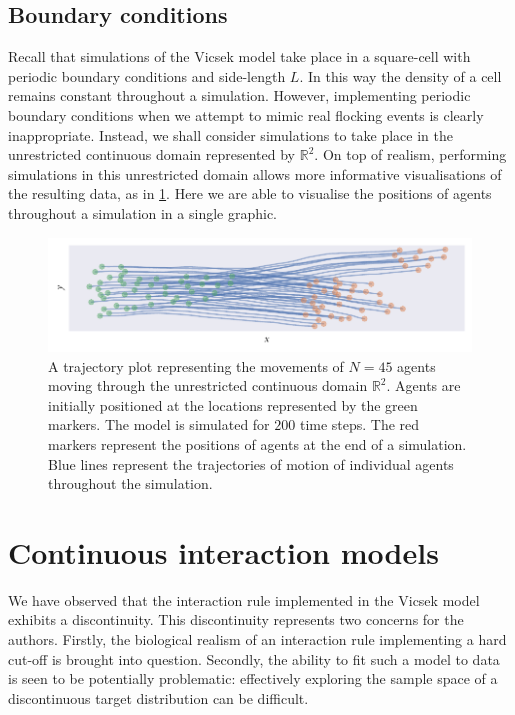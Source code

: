 \subsection{Boundary conditions}

Recall that simulations of the Vicsek model take place in a square-cell with periodic
boundary conditions and side-length $L$. In this way the density of a cell remains
constant throughout a simulation. However, implementing periodic boundary conditions when
we attempt to mimic real flocking events is clearly inappropriate. Instead, we shall
consider simulations to take place in the unrestricted continuous domain represented by
$\mathbb{R}^2$.  On top of realism, performing simulations in this unrestricted domain
allows more informative visualisations of the resulting data, as in
\cref{fig:example_traj}. Here we are able to visualise the positions of agents throughout
a simulation in a single graphic.

\begin{figure}[tb]
    \includegraphics{example_traj_plot.pdf}
    \caption{A trajectory plot representing the movements of $N=45$ agents moving through
        the unrestricted continuous domain $\mathbb{R}^2$. Agents are initially positioned
        at the locations represented by the green markers. The model is simulated for
        $200$ time steps. The red markers represent the positions of agents at the end of
        a simulation. Blue lines represent the trajectories of motion of individual agents
        throughout the simulation.}
    \label{fig:example_traj}
\end{figure}

\section{Continuous interaction models}

We have observed that the interaction rule implemented in the Vicsek model exhibits a
discontinuity. This discontinuity represents two concerns for the authors. Firstly, the
biological realism of an interaction rule implementing a hard cut-off is brought into
question. Secondly, the ability to fit such a model to data is seen to be potentially
problematic: effectively exploring the sample space of a discontinuous target
distribution can be difficult.

